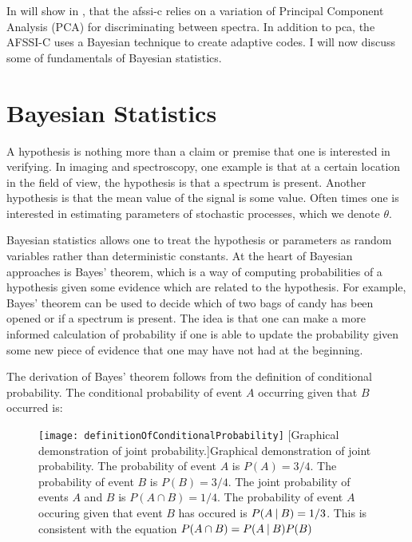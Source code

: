 In will show in , that the \gls{afssi-c} relies on a variation of Principal Component Analysis (PCA) for discriminating between spectra. In addition to \gls{pca}, the AFSSI-C uses a Bayesian technique to create adaptive codes. I will now discuss some of fundamentals of Bayesian statistics. 

\section{Bayesian Statistics}

A hypothesis is nothing more than a claim or premise that one is interested in verifying. In imaging and spectroscopy, one example is that at a certain location in the field of view, the hypothesis is that a spectrum is present. Another hypothesis is that the mean value of the signal is some value. Often times one is interested in estimating parameters of stochastic processes, which we denote $\theta$. 

Bayesian statistics allows one to treat the hypothesis or parameters as random variables rather than deterministic constants. At the heart of Bayesian approaches is Bayes' theorem, which is a way of computing probabilities of a hypothesis given some evidence which are related to the hypothesis. For example, Bayes' theorem can be used to decide which of two bags of candy has been opened or if a spectrum is present. The idea is that one  can make a more informed calculation of probability if one is able to update the probability given some new piece of evidence that one may have not had at the beginning.

The derivation of Bayes' theorem follows from the definition of conditional probability. The conditional probability of event $A$ occurring given that $B$ occurred is:

\begin{figure}
	\texttt{[image: definitionOfConditionalProbability]}
	[Graphical demonstration of joint probability.]{Graphical demonstration of joint probability. The probability of event $A$ is $P(A)=3/4$. The probability of event $B$ is $P(B)=3/4$. The joint probability of events $A$ and $B$ is $P(A \cap B) = 1/4$. The probability of event $A$ occuring given that event $B$ has occured is $P( A \:\vert\: B) = 1/3$. This is consistent with the equation $ P(A \cap B) = P(A \:\vert\: B) P(B) $}
	\label{fig:definitionOfConditionalProbability}
\end{figure}

